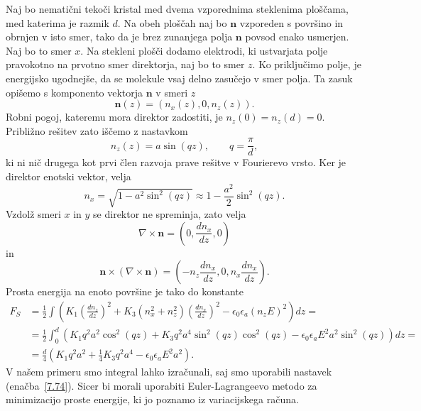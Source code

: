 Naj bo nematični tekoči kristal med dvema vzporednima
steklenima ploščama, med katerima je razmik $d$. Na obeh ploščah naj bo $\mathbf{n}$ vzporeden
s površino in obrnjen v isto smer, tako da je brez zunanjega 
polja $\mathbf{n}$ povsod enako usmerjen. Naj bo to smer $x$.
Na stekleni plošči dodamo elektrodi, ki ustvarjata polje pravokotno na 
prvotno smer direktorja, naj bo to smer $z$.
Ko priključimo polje, je energijsko ugodnejše, da
se molekule vsaj delno zasučejo v smer polja. Ta zasuk opišemo s
komponento vektorja $\mathbf{n}$ v smeri $z$
\begin{equation}
\mathbf{n}(z)=(n_{x}(z),0,n_{z}(z)).
\label{7.73}
\end{equation}
Robni pogoj, kateremu mora direktor zadostiti,
je $n_{z}(0)=n_{z}(d)=0$. Približno rešitev zato iščemo z nastavkom 
\begin{equation}
n_{z}(z)=a\sin (qz), \qquad q=\frac{\pi}{d},
\label{7.74}
\end{equation}
ki ni nič drugega kot prvi člen razvoja prave rešitve v Fourierevo vrsto.
Ker je direktor enotski vektor, velja
\begin{equation}
n_x = \sqrt{1-a^2\sin^2(qz)} \approx 1 - \frac{a^2}{2}\sin^2(qz).
\end{equation}
Vzdolž smeri $x$ in $y$ se direktor ne spreminja, zato velja
\begin{equation}
\nabla\times\mathbf{n}=\left(0,\frac{dn_{x}}{dz},0\right)
\label{7.75}
\end{equation}
 in 
\begin{equation}
\mathbf{n}\times(\nabla\times\mathbf{n})=\left(-n_{z}\frac{dn_{x}}{dz},0,
n_{x}\frac{dn_{x}}{dz}\right).
\label{7.76}
\end{equation}
Prosta energija na enoto površine je tako do konstante
\begin{align}
F_S & =  \frac{1}{2}\int\left(K_{1}\left(\frac{dn_{z}}{dz}\right)^{2}+K_{3}(n_x^2+n_{z}^{2})
\left(\frac{dn_{x}}{dz}\right)^{2}-
\epsilon_{0}\epsilon_{a}(n_{z}E)^{2}\right)dz=\nonumber \\
 & =  \frac{1}{2}\int_{0}^{d}
 \left(K_{1}q^{2}a^{2}\cos^{2}(qz)+K_{3}q^{2}a^{4}\sin^{2}(qz)\cos^2(qz)-
 \epsilon_{0}\epsilon_{a}E^2a^{2}\sin^{2}(qz)\right)dz=\nonumber \\
 & =  \frac{d}{4}\left( K_{1}q^{2}a^2+\frac{1}{4}K_{3}q^{2}a^4-\epsilon_{0}\epsilon_{a}E^2a^2\right).
\end{align}
V našem primeru smo integral lahko izračunali, saj smo uporabili nastavek (enačba~\ref{7.74}).
Sicer bi morali uporabiti Euler-Lagrangeevo metodo za minimizacijo proste energije, ki 
jo poznamo iz variacijskega računa.

